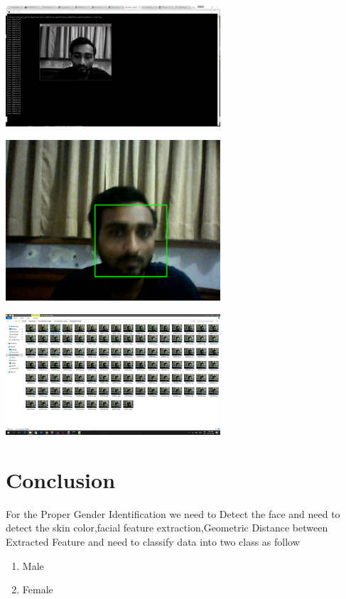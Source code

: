 \documentclass[journal]{IEEEtran}
\begin{document}
	\begin{minipage}{\linewidth}
		\centering
		\includegraphics[width = 80mm]{1.png}
	\end{minipage} 
	
	\begin{minipage}{\linewidth}
		\centering
		\includegraphics[width = 80mm]{2.png}
	\end{minipage} 
	
	\begin{minipage}{\linewidth}
		\centering
		\includegraphics[width = 80mm]{3.png}
	\end{minipage} 
	
	\section{\textbf{Conclusion}}
	For the Proper Gender Identification we need to Detect the face and need to detect the skin color,facial feature extraction,Geometric Distance between Extracted Feature and need to classify data into two class as follow
	\begin{enumerate}
		\item Male
		\item Female
	\end{enumerate} 
	 
\end{document}
